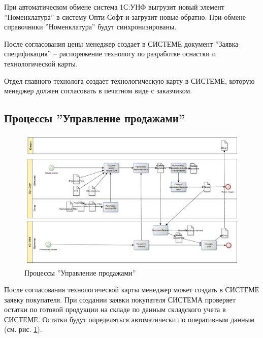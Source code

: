 При автоматическом обмене система 1С:УНФ выгрузит новый элемент ''Номенклатура'' в систему Опти-Софт и загрузит новые обратно. При обмене справочники ''Номенклатура'' будут синхронизированы. 


После согласования цены менеджер создает в СИСТЕМЕ документ ''Заявка-спецификация'' -- распоряжение технологу по разработке оснастки и технологической карты. 

Отдел главного технолога создает технологическую карту в СИСТЕМЕ, которую менеджер должен согласовать в печатном виде с заказчиком. 



\subsection{Процессы ''Управление продажами''}
\begin{figure}
\begin{center}
  \includegraphics[angle=90, height=0.9\textheight, keepaspectratio]{Pics/2_Sales.pdf}
\end{center}
  \caption{Процессы ''Управление продажами''}
  \label{pic:Schema_2}
\end{figure}
\clearpage




После согласования технологической карты менеджер может создать в СИСТЕМЕ заявку покупателя. При создании заявки покупателя СИСТЕМА проверяет остатки по готовой продукции на складе по данным  складского учета в СИСТЕМЕ. Остатки будут определяться автоматически по оперативным данным (см. рис. \ref{pic:Schema_2}).

